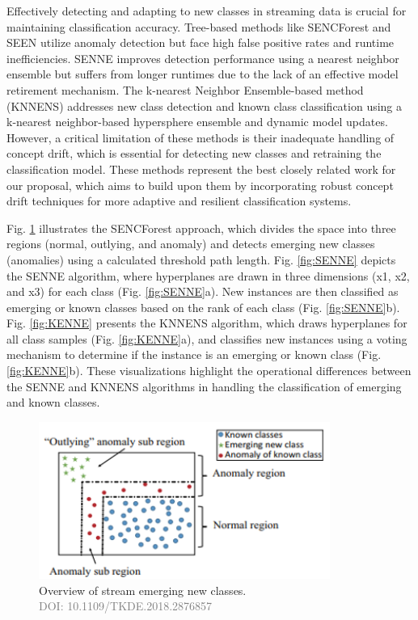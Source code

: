 Effectively detecting and adapting to new classes in streaming data is crucial for maintaining classification accuracy. Tree-based methods like SENCForest and SEEN utilize anomaly detection but face high false positive rates and runtime inefficiencies. SENNE improves detection performance using a nearest neighbor ensemble but suffers from longer runtimes due to the lack of an effective model retirement mechanism. The k-nearest Neighbor Ensemble-based method (KNNENS) addresses new class detection and known class classification using a k-nearest neighbor-based hypersphere ensemble and dynamic model updates. However, a critical limitation of these methods is their inadequate handling of concept drift, which is essential for detecting new classes and retraining the classification model. These methods represent the best closely related work for our proposal, which aims to build upon them by incorporating robust concept drift techniques for more adaptive and resilient classification systems.

Fig. \ref{fig:SENCForest} illustrates the SENCForest approach, which divides the space into three regions (normal, outlying, and anomaly) and detects emerging new classes (anomalies) using a calculated threshold path length. Fig. \ref{fig:SENNE} depicts the SENNE algorithm, where hyperplanes are drawn in three dimensions (x1, x2, and x3) for each class (Fig. \ref{fig:SENNE}a). New instances are then classified as emerging or known classes based on the rank of each class (Fig. \ref{fig:SENNE}b). Fig. \ref{fig:KENNE} presents the KNNENS algorithm, which draws hyperplanes for all class samples (Fig. \ref{fig:KENNE}a), and classifies new instances using a voting mechanism to determine if the instance is an emerging or known class (Fig. \ref{fig:KENNE}b). These visualizations highlight the operational differences between the SENNE and KNNENS algorithms in handling the classification of emerging and known classes.

\begin{figure}[!ht]
    \begin{center}
      \includegraphics[width=0.85\textwidth]{3_State-of-the-art/fig/SENCForst.png}
    \end{center}

    \caption{Overview of stream emerging new classes. \\ \textcolor{gray}{\fontsize{10}{0}\selectfont DOI: 10.1109/TKDE.2018.2876857}}
    \label{fig:SENCForest}
    \end{figure}
    

